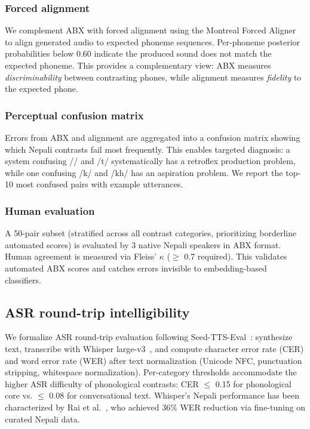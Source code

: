 \documentclass{Interspeech}
\begin{document}
\subsubsection{Forced alignment}

We complement ABX with forced alignment using the Montreal Forced Aligner~\cite{McAuliffe2017} to align generated audio to expected phoneme sequences. Per-phoneme posterior probabilities below 0.60 indicate the produced sound does not match the expected phoneme. This provides a complementary view: ABX measures \textit{discriminability} between contrasting phones, while alignment measures \textit{fidelity} to the expected phone.

\subsubsection{Perceptual confusion matrix}

Errors from ABX and alignment are aggregated into a confusion matrix showing which Nepali contrasts fail most frequently. This enables targeted diagnosis: a system confusing // and /t/ systematically has a retroflex production problem, while one confusing /k/ and /kh/ has an aspiration problem. We report the top-10 most confused pairs with example utterances.

\subsubsection{Human evaluation}

A 50-pair subset (stratified across all contrast categories, prioritizing borderline automated scores) is evaluated by 3 native Nepali speakers in ABX format. Human agreement is measured via Fleiss' $\kappa$ ($\geq$ 0.7 required). This validates automated ABX scores and catches errors invisible to embedding-based classifiers.


\subsection{ASR round-trip intelligibility}

We formalize ASR round-trip evaluation following Seed-TTS-Eval~\cite{SeedTTS2024}: synthesize text, transcribe with Whisper large-v3~\cite{Radford2023}, and compute character error rate (CER) and word error rate (WER) after text normalization (Unicode NFC, punctuation stripping, whitespace normalization). Per-category thresholds accommodate the higher ASR difficulty of phonological contrasts: CER $\leq$ 0.15 for phonological core vs. $\leq$ 0.08 for conversational text. Whisper's Nepali performance has been characterized by Rai et al.~\cite{Rai2024}, who achieved 36\% WER reduction via fine-tuning on curated Nepali data.
\end{document}
